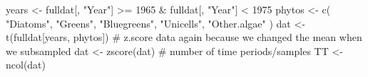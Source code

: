 \begin{Schunk}
\begin{Sinput}
 years <- fulldat[, "Year"] >= 1965 & fulldat[, "Year"] < 1975
 phytos <- c(
   "Diatoms", "Greens", "Bluegreens",
   "Unicells", "Other.algae"
 )
 dat <- t(fulldat[years, phytos])
 # z.score data again because we changed the mean when we subsampled
 dat <- zscore(dat)
 # number of time periods/samples
 TT <- ncol(dat)
\end{Sinput}
\end{Schunk}
